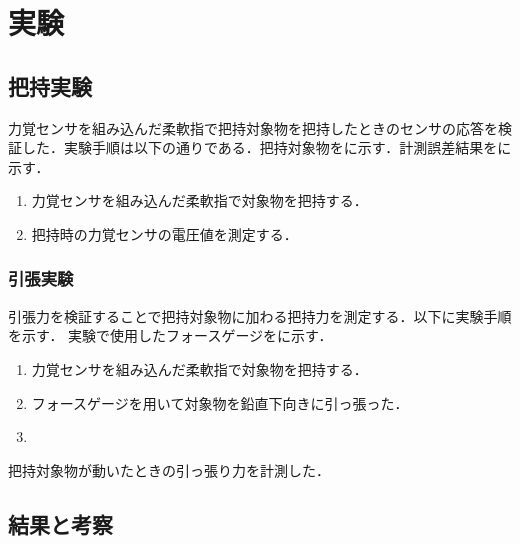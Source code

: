 \section{実験}
\subsection{把持実験}
力覚センサを組み込んだ柔軟指で把持対象物を把持したときのセンサの応答を検証した．実験手順は以下の通りである．把持対象物をに示す．計測誤差結果をに示す．

\begin{enumerate}
  \item 力覚センサを組み込んだ柔軟指で対象物を把持する．  
  \item 把持時の力覚センサの電圧値を測定する．
\end{enumerate}

\subsubsection{引張実験}
引張力を検証することで把持対象物に加わる把持力を測定する．以下に実験手順を示す．
実験で使用したフォースゲージをに示す．

\begin{enumerate}
  \item 力覚センサを組み込んだ柔軟指で対象物を把持する．  
  \item フォースゲージを用いて対象物を鉛直下向きに引っ張った．
  \item 
\end{enumerate}把持対象物が動いたときの引っ張り力を計測した．

\subsection{結果と考察}

\newpage



  
